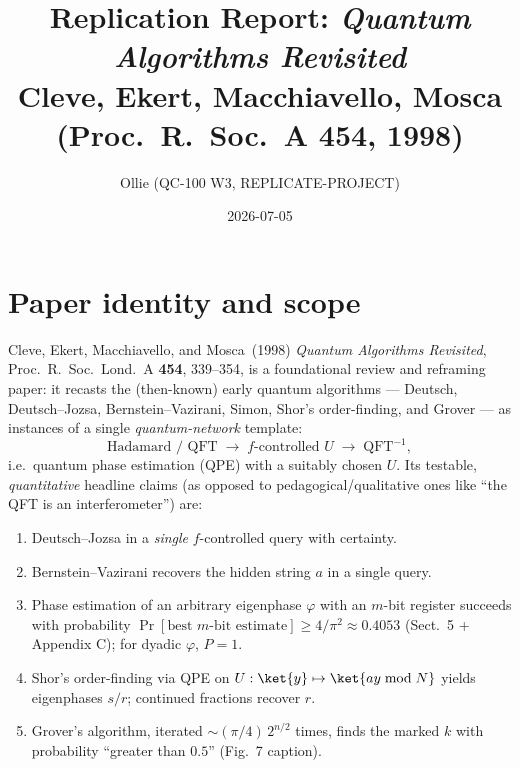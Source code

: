 \documentclass[11pt]{article}
\title{Replication Report: \emph{Quantum Algorithms Revisited}\\
\large Cleve, Ekert, Macchiavello, Mosca (Proc.\ R.\ Soc.\ A 454, 1998)}
\author{Ollie (QC-100 W3, REPLICATE-PROJECT)}
\date{2026-07-05}
\begin{document}
\maketitle

\section{Paper identity and scope}
Cleve, Ekert, Macchiavello, and Mosca~(1998) \emph{Quantum Algorithms Revisited},
Proc.\ R.\ Soc.\ Lond.\ A \textbf{454}, 339--354, is a foundational review and
reframing paper: it recasts the (then-known) early quantum algorithms
--- Deutsch, Deutsch--Jozsa, Bernstein--Vazirani, Simon, Shor's order-finding,
and Grover --- as instances of a single \emph{quantum-network} template:
\[
\text{Hadamard / QFT} \;\longrightarrow\; f\text{-controlled }U \;\longrightarrow\;
\text{QFT}^{-1},
\]
i.e.\ quantum phase estimation (QPE) with a suitably chosen $U$. Its
testable, \emph{quantitative} headline claims (as opposed to
pedagogical/qualitative ones like ``the QFT is an interferometer'') are:
\begin{enumerate}
    \item Deutsch--Jozsa in a \emph{single} $f$-controlled query with certainty.
    \item Bernstein--Vazirani recovers the hidden string $a$ in a single query.
    \item Phase estimation of an arbitrary eigenphase $\varphi$ with an $m$-bit
          register succeeds with probability
          $\Pr[\text{best }m\text{-bit estimate}] \ge 4/\pi^{2} \approx 0.4053$
          (Sect.~5 + Appendix C); for dyadic $\varphi$, $P=1$.
    \item Shor's order-finding via QPE on $U:\ket{y}\mapsto\ket{ay\bmod N}$
          yields eigenphases $s/r$; continued fractions recover $r$.
    \item Grover's algorithm, iterated $\sim (\pi/4)\,2^{n/2}$ times, finds the
          marked $k$ with probability ``greater than $0.5$'' (Fig.~7 caption).
\end{enumerate}
\end{document}
